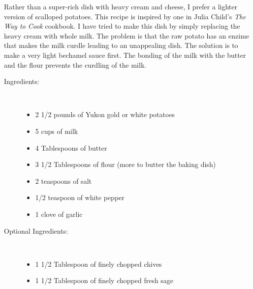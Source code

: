 \documentclass[11pt,letterpaper]{article}
\begin{document}


Rather than a super-rich dish with heavy cream and cheese, I prefer a lighter version of scalloped potatoes. This recipe is inspired by one in Julia Child's {\it The Way to Cook} cookbook. I have tried to make this dish by simply replacing the heavy cream with whole milk. The problem is that the raw potato has an enzime that makes the milk curdle leading to an unappealing dish. The solution is to make a very light bechamel sauce first. The bonding of the milk with the butter and the flour prevents the curdling of the milk. 

\begin{description}

\item[Ingredients:]\ \\
	\begin{itemize}
	\item 2 1/2 pounds of Yukon gold or white potatoes
	\item 5 cups of milk
	\item 4 Tablespoons of butter
	\item 3 1/2 Tablespoons of flour (more to butter the baking dish)
	\item 2 teaspoons of salt
	\item 1/2 teaspoon of white pepper
	\item 1 clove of garlic
	\end{itemize}

\item[Optional Ingredients:]\ \\
	\begin{itemize}
	\item 1 1/2 Tablespoon of finely chopped chives
	\item 1 1/2 Tablespoon of finely chopped fresh sage
	\end{itemize}


\end{description}
\end{document}
